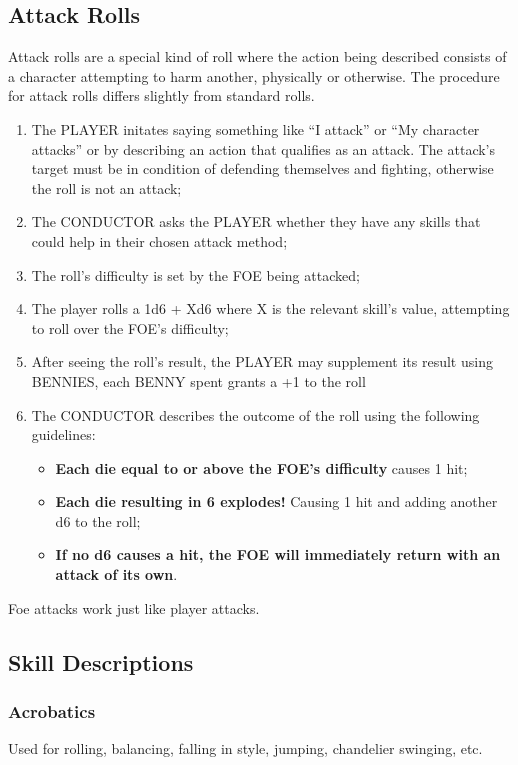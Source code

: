 \subsection{Attack Rolls}
Attack rolls are a special kind of roll where the action being described consists of a character attempting to harm another, physically or otherwise. The procedure for attack rolls differs slightly from standard rolls.
\begin{enumerate}
    \item {The PLAYER initates saying something like ``I attack'' or ``My character attacks'' or by describing an action that qualifies as an attack. The attack's target must be in condition of defending themselves and fighting, otherwise the roll is not an attack;}
    \item {The CONDUCTOR asks the PLAYER whether they have any skills that could help in their chosen attack method;}
    \item {The roll's difficulty is set by the FOE being attacked;}
    \item {The player rolls a 1d6 + Xd6 where X is the relevant skill's value, attempting to roll over the FOE's difficulty;}
    \item {After seeing the roll's result, the PLAYER may supplement its result using BENNIES, each BENNY spent grants a +1 to the roll}
    \item {The CONDUCTOR describes the outcome of the roll using the following guidelines:}
    \begin{itemize}
        \item {\textbf{Each die equal to or above the FOE's difficulty} causes 1 hit;}
        \item {\textbf{Each die resulting in 6 explodes!} Causing 1 hit and adding another d6 to the roll;}
        \item {\textbf{If no d6 causes a hit, the FOE will immediately return with an attack of its own}.}
    \end{itemize}
\end{enumerate}
Foe attacks work just like player attacks.

\subsection{Skill Descriptions}
\subsubsection*{Acrobatics}
Used for rolling, balancing, falling in style, jumping, chandelier swinging, etc.
